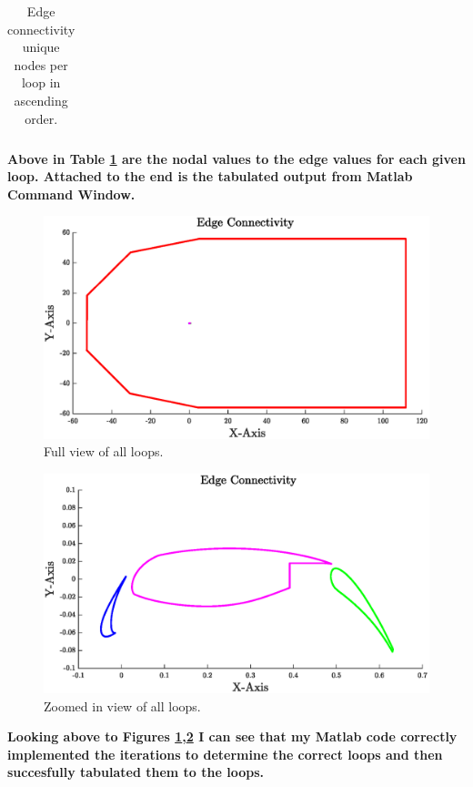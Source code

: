 \begin{table}[h!]
    \centering
    \caption{Edge connectivity unique nodes per loop in ascending order.}
    \label{tab:loop_results}
    \begin{tabular}{ r | r | r | r | r | r | r | r | r | r }
        
    \end{tabular}
\end{table}

\begin{fminipage}{0.8\linewidth}
    \textbf{Above in Table \ref{tab:loop_results} are the nodal values to the edge values for each given loop. Attached to the end is the tabulated output from Matlab Command Window.}
\end{fminipage}

\pagebreak
\begin{figure}[h]
    \centering
    \includegraphics[width = 0.8\linewidth]{q4/big_loops.eps}
    \caption{Full view of all loops.}
    \label{fig:big_loops}
\end{figure}


\begin{figure}[h!]
    \centering
    \includegraphics[width = 0.8\linewidth]{q4/small_loops.eps}
    \caption{Zoomed in view of all loops.}
    \label{fig:small_loops}
\end{figure}


\begin{fminipage}{0.8\linewidth}
    \textbf{Looking above to Figures \ref{fig:big_loops},\ref{fig:small_loops} I can see that my Matlab code correctly implemented the iterations to determine the correct loops and then succesfully tabulated them to the loops.}
\end{fminipage}
